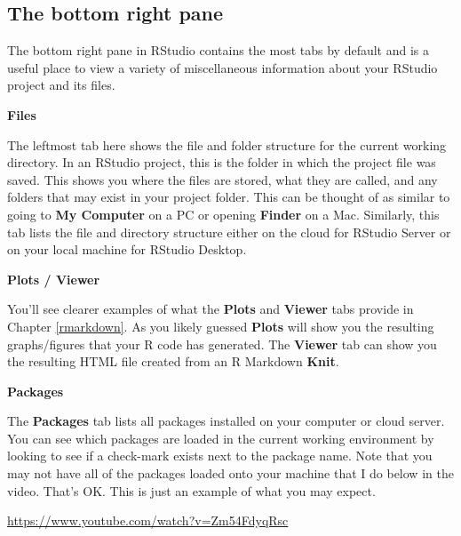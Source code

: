 \documentclass[]{tufte-book}
\begin{document}
\hypertarget{the-bottom-right-pane}{%
\subsection{The bottom right pane}\label{the-bottom-right-pane}}

The bottom right pane in RStudio contains the most tabs by default and is a useful place to view a variety of miscellaneous information about your RStudio project and its files.

\vspace*{0.2in}

\noindent\textbf{Files}\vspace*{0.1in}

The leftmost tab here shows the file and folder structure for the current working directory. In an RStudio project, this is the folder in which the project file was saved. This shows you where the files are stored, what they are called, and any folders that may exist in your project folder. This can be thought of as similar to going to \textbf{My Computer} on a PC or opening \textbf{Finder} on a Mac. Similarly, this tab lists the file and directory structure either on the cloud for RStudio Server or on your local machine for RStudio Desktop.

\vspace*{0.2in}

\noindent\textbf{Plots / Viewer}\vspace*{0.1in}

You'll see clearer examples of what the \textbf{Plots} and \textbf{Viewer} tabs provide in Chapter \ref{rmarkdown}. As you likely guessed \textbf{Plots} will show you the resulting graphs/figures that your R code has generated. The \textbf{Viewer} tab can show you the resulting HTML file created from an R Markdown \textbf{Knit}.

\vspace*{0.2in}

\noindent\textbf{Packages}\vspace*{0.1in}

The \textbf{Packages} tab lists all packages installed on your computer or cloud server. You can see which packages are loaded in the current working environment by looking to see if a check-mark exists next to the package name. Note that you may not have all of the packages loaded onto your machine that I do below in the video. That's OK. This is just an example of what you may expect.

\vspace{0.1in}\begin{center}\footnotesize{\url{https://www.youtube.com/watch?v=Zm54FdyqRsc}}\end{center}\vspace{0.1in}
\end{document}
